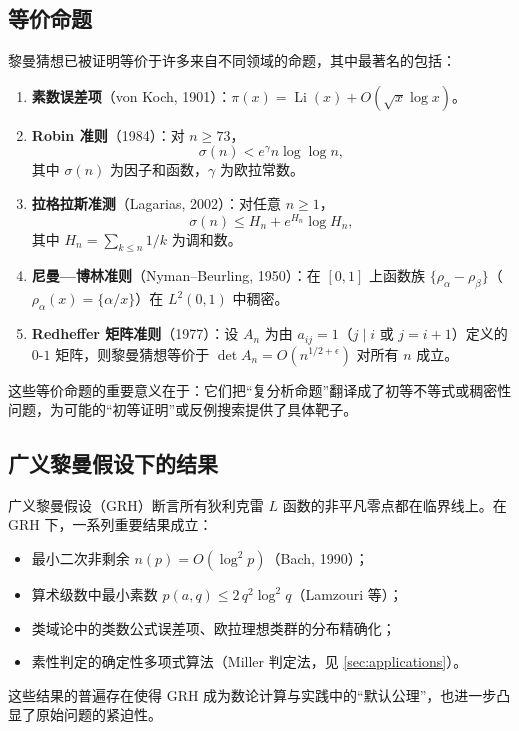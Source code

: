 \subsection{等价命题}

黎曼猜想已被证明等价于许多来自不同领域的命题，其中最著名的包括：

\begin{enumerate}[label=(\arabic*)]
    \item \textbf{素数误差项}（von Koch, 1901）：$\pi(x) = \operatorname{Li}(x) + O(\sqrt{x}\log x)$\cite{vonkoch1901}。
    \item \textbf{Robin 准则}（1984）：对 $n \ge 73$，
    \begin{equation}
        \sigma(n) < e^{\gamma} n \log \log n,
    \end{equation}
    其中 $\sigma(n)$ 为因子和函数，$\gamma$ 为欧拉常数\cite{robin1984divisors}。
    \item \textbf{拉格拉斯准测}（Lagarias, 2002）：对任意 $n \ge 1$，
    \begin{equation}
        \sigma(n) \le H_n + e^{H_n} \log H_n,
    \end{equation}
    其中 $H_n = \sum_{k \le n} 1/k$ 为调和数\cite{lagarias2002elementary}。
    \item \textbf{尼曼—博林准则}（Nyman--Beurling, 1950）：在 $[0,1]$ 上函数族 $\{\rho_\alpha - \rho_\beta\}$（$\rho_\alpha(x) = \{\alpha/x\}$）在 $L^2(0,1)$ 中稠密。
    \item \textbf{Redheffer 矩阵准则}（1977）：设 $A_n$ 为由 $a_{ij}=1$（$j \mid i$ 或 $j = i+1$）定义的 $0$-$1$ 矩阵，则黎曼猜想等价于 $\det A_n = O(n^{1/2+\epsilon})$ 对所有 $n$ 成立。
\end{enumerate}

这些等价命题的重要意义在于：它们把“复分析命题”翻译成了初等不等式或稠密性问题，为可能的“初等证明”或反例搜索提供了具体靶子。

\subsection{广义黎曼假设下的结果}

广义黎曼假设（GRH）断言所有狄利克雷 $L$ 函数的非平凡零点都在临界线上。在 GRH 下，一系列重要结果成立：

\begin{itemize}
    \item 最小二次非剩余 $n(p) = O(\log^2 p)$（Bach, 1990）；
    \item 算术级数中最小素数 $p(a,q) \le 2\, q^2 \log^2 q$（Lamzouri 等）；
    \item 类域论中的类数公式误差项、欧拉理想类群的分布精确化；
    \item 素性判定的确定性多项式算法（Miller 判定法，见 \cref{sec:applications}）。
\end{itemize}

这些结果的普遍存在使得 GRH 成为数论计算与实践中的“默认公理”，也进一步凸显了原始问题的紧迫性。
